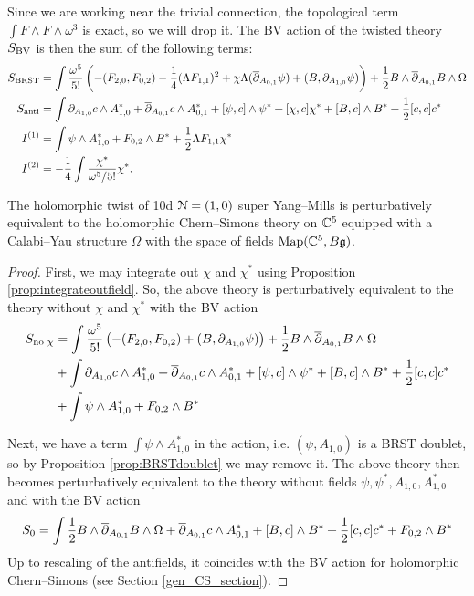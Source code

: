 \documentclass[10pt, oneside]{article}
\begin{document}
Since we are working near the trivial connection, the topological term $\int F\wedge F\wedge \omega^3$ is exact, so we will drop it. The BV action of the twisted theory $S_{\mathrm{BV}}$ is then the sum of the following terms:
\begin{align*}
S_{\mathrm{BRST}} &= \int \frac{\omega^5}{5!} \left(-(F_{2, 0}, F_{0, 2}) - \frac{1}{4}(\Lambda F_{1, 1})^2 + \chi \Lambda(\overline{\partial}_{A_{0, 1}}\psi) + (B, \partial_{A_{1, 0}} \psi)\right)  + \frac{1}{2}B\wedge \overline{\partial}_{A_{0, 1}} B\wedge\Omega \\
S_{\mathrm{anti}} &= \int \partial_{A_{1, 0}} c\wedge A_{1, 0}^* + \overline{\partial}_{A_{0, 1}} c\wedge A_{0, 1}^* + [\psi, c]\wedge \psi^* + [\chi, c]\chi^* + [B, c]\wedge B^* + \frac{1}{2}[c, c]c^* \\
I^{(1)} &= \int \psi\wedge A_{1, 0}^* + F_{0, 2}\wedge B^* + \frac{1}{2}\Lambda F_{1, 1} \chi^* \\
I^{(2)} &= -\frac{1}{4}\int \frac{\chi^*}{\omega^5/5!} \chi^*.
\end{align*}

\begin{thm}
The holomorphic twist of 10d $\mathcal{N}=(1, 0)$ super Yang--Mills is perturbatively equivalent to the holomorphic Chern--Simons theory on $\mathbb C^5$ equipped with a Calabi--Yau structure $\Omega$ with the space of fields $\operatorname{Map}(\mathbb C^5, B\mathfrak{g})$.
\label{thm:10dholomorphictwist}
\end{thm}

\begin{proof}
First, we may integrate out $\chi$ and $\chi^*$ using Proposition \ref{prop:integrateoutfield}. So, the above theory is perturbatively equivalent to the theory without $\chi$ and $\chi^*$ with the BV action
\begin{align*}
S_{\text{no }\chi} &= \int \frac{\omega^5}{5!} \left(-(F_{2, 0}, F_{0, 2}) + (B, \partial_{A_{1, 0}} \psi)\right)  + \frac{1}{2}B\wedge \overline{\partial}_{A_{0, 1}} B\wedge\Omega \\
&+ \int \partial_{A_{1, 0}} c\wedge A_{1, 0}^* + \overline{\partial}_{A_{0, 1}} c\wedge A_{0, 1}^* + [\psi, c]\wedge \psi^* + [B, c]\wedge B^* + \frac{1}{2}[c, c]c^* \\
&+ \int \psi\wedge A_{1, 0}^* + F_{0, 2}\wedge B^*
\end{align*}

Next, we have a term $\int \psi\wedge A_{1, 0}^*$ in the action, i.e. $(\psi, A_{1, 0})$ is a BRST doublet, so by Proposition \ref{prop:BRSTdoublet} we may remove it. The above theory then becomes perturbatively equivalent to the theory without fields $\psi,\psi^*,A_{1,0},A_{1,0}^*$ and with the BV action
\[
S_0 = \int \frac{1}{2}B\wedge \overline{\partial}_{A_{0, 1}} B\wedge\Omega + \overline{\partial}_{A_{0, 1}} c\wedge A_{0, 1}^* + [B, c]\wedge B^* + \frac{1}{2}[c, c]c^* + F_{0, 2}\wedge B^*
\]
Up to rescaling of the antifields, it coincides with the BV action for holomorphic Chern--Simons (see Section \ref{gen_CS_section}).
\end{proof}
\end{document}
